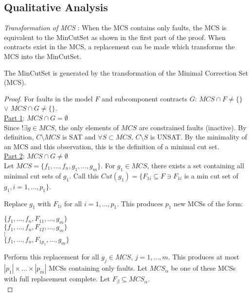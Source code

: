 \subsection{Qualitative Analysis}

\textit{Transformation of MCS} : When the MCS contains only faults, the MCS is equivalent to the MinCutSet as shown in the first part of the proof. When contracts exist in the MCS, a replacement can be made which transforms the MCS into the MinCutSet. \\

\begin{theorem}  The MinCutSet is generated by the transformation of the Minimal Correction Set (MCS).\\

\begin{proof}  For faults in the model $F$ and subcomponent contracts $G$: $MCS \cap F \neq \{\}$ $\lor$ $MCS \cap G \neq \{\}$.\\

\underline{Part 1}: $MCS \cap G = \emptyset$\\

Since $!\exists g \in MCS$, the only elements of $MCS$ are constrained faults (inactive). By definition, $C\setminus MCS$ is SAT and $\forall S \subset MCS$, $C\setminus S$ is UNSAT. By the minimality of an MCS and this observation, this is the definition of a minimal cut set. \\

\underline{Part 2}: $MCS \cap G \neq \emptyset$\\

Let $MCS = \{f_1,...,f_n,g_1,...,g_m\}$. For $g_1 \in MCS$, there exists a set containing all minimal cut sets of $g_1$. Call this $Cut(g_1) = \{F_{1i} \subseteq F \ni F_{1i}$ is a min cut set of $g_1, i = 1,...,p_1\}$. 

Replace $g_1$ with $F_{1i}$ for all $i = 1,...,p_1$. This produces $p_1$ new MCSs of the form:
\begin{center}
$\{f_1,...,f_n,F_{11},...,g_m\}$\\
$\{f_1,...,f_n,F_{12},...,g_m\}$\\
$\vdots$\\
$\{f_1,...,f_n,F_{1p_1},...,g_m\}$\\
\end{center}

Perform this replacement for all $g_j \in MCS$, $j=1,...,m$. This produces at most $|p_1| \times \hdots \times |p_m|$ MCSs containing only faults. Let $MCS_\alpha$ be one of these MCSs with full replacement complete. Let $F_\beta \subseteq MCS_\alpha$.\\


\end{proof}
\end{theorem}
